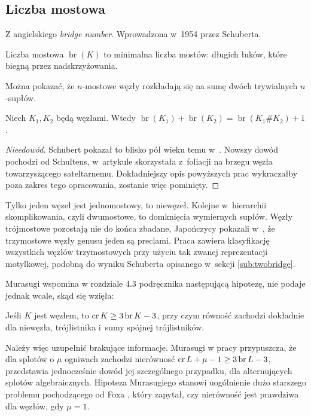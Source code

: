 \subsection{Liczba mostowa} %
\label{sub:bridge_index}
Z angielskiego \emph{bridge number}.
Wprowadzona w~1954 przez Schuberta.
\begin{definition}
    Liczba mostowa $\operatorname{br}(K)$ to minimalna liczba mostów:
    długich łuków, które biegną przez nadskrzyżowania.
\end{definition}

Można pokazać, że $n$-mostowe węzły rozkładają się na sumę dwóch trywialnych $n$-supłów.

\begin{proposition}
    \label{bridge_additive}
    Niech $K_1, K_2$ będą węzłami.
    Wtedy $\operatorname{br} (K_1) + \operatorname{br}(K_2) = \operatorname{br}(K_1 \# K_2) + 1$.
\end{proposition}

\begin{proof}[Nieedowód]
    Schubert pokazał to blisko pół wieku temu w~\cite{schubert54}.
    Nowszy dowód pochodzi od Schultens, w~artykule \cite{schultens03} skorzystała z~foliacji na brzegu węzła towarzyszącego sateltarnemu.
    Dokładniejszy opis powyższych prac wykraczałby poza zakres tego opracowania, zostanie więc pominięty.
\end{proof}

Tylko jeden węzeł jest jednomostowy, to niewęzeł.
Kolejne w~hierarchii skomplikowania, czyli dwumostowe, to domknięcia wymiernych supłów.
Węzły trójmostowe pozostają nie do końca zbadane, Japończycy pokazali w~\cite{fukuhama99}, że trzymostowe węzły genusu jeden są preclami.
Praca \cite{hilden12} zawiera klasyfikację wszystkich węzłów trzymostowych przy użyciu tak zwanej reprezentacji motylkowej, podobną do wyniku Schuberta opisanego w~sekcji \ref{sub:twobridge}.

Murasugi wspomina w rozdziale 4.3 podręcznika \cite{murasugi96} następującą hipotezę, nie podaje jednak wcale, skąd się wzięła:

\begin{conjecture}
    Jeśli $K$ jest węzłem, to $\operatorname{cr} K \ge 3 \operatorname{br} K - 3$, przy czym równość zachodzi dokładnie dla niewęzła, trójlistnika i~sumy spójnej trójlistników.
\end{conjecture}

Należy więc uzupełnić brakujące informacje.
Murasugi w pracy \cite{murasugi88} przypuszcza, że dla splotów o $\mu$ ogniwach zachodzi nierównosć $\operatorname{cr} L + \mu - 1 \ge 3 \operatorname{br} L - 3$, przedstawia jednocześnie dowód jej szczególnego przypadku, dla alternujących splotów algebraicznych.
Hipoteza Murasugiego stanowi uogólnienie dużo starszego problemu pochodzącego od Foxa \cite{fox50}, który zapytał, czy nierówność jest prawdziwa dla węzłów, gdy $\mu = 1$.

